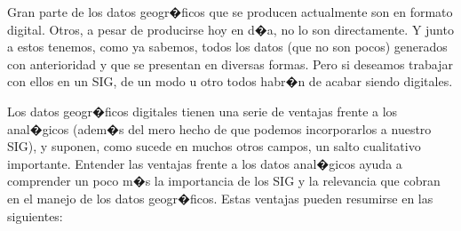 Gran parte de los datos geogr�ficos que se producen actualmente son en formato digital. Otros, a pesar de producirse hoy en d�a, no lo son directamente. Y junto a estos tenemos, como ya sabemos, todos los datos (que no son pocos) generados con anterioridad y que se presentan en diversas formas. Pero si deseamos trabajar con ellos en un SIG, de un modo u otro todos habr�n de acabar siendo digitales.

Los datos geogr�ficos digitales tienen una serie de ventajas frente a los anal�gicos (adem�s del mero hecho de que podemos incorporarlos a nuestro SIG), y suponen, como sucede en muchos otros campos, un salto cualitativo importante. Entender las ventajas frente a los datos anal�gicos ayuda a comprender un poco m�s la importancia de los SIG y la relevancia que cobran en el manejo de los datos geogr�ficos. Estas ventajas pueden resumirse en las siguientes:

